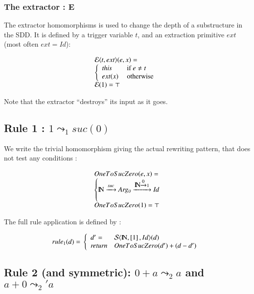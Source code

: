 \subsubsection{The extractor : {\cal E}}

The extractor homomorphisms is used to change the depth of a substructure in the SDD. It is defined by a trigger variable $t$, and an extraction primitive $ext$  (most often $ext = \mathit{Id}$):

$$
\begin{array}{lcl}
{\cal E}\langle {t,ext} \rangle (e,x)= \\
\left\{\begin{array}{ll}
\mathit{this} & \mbox{ if } e \neq t \\
ext (x) & \mbox{ otherwise } \\
\end{array}
\right. \\
 {\cal E}(1) = \top 
\end{array}
$$

Note that the extractor ``destroys'' its input as it goes.


\subsection{Rule 1 : $1 \leadsto_1 suc(0)$}

We write the trivial homomorphism giving the actual rewriting pattern, that does not test any conditions :

$$
\begin{array}{lcl}
{OneToSucZero} (e,x)= \\
\left\{
 \mbox{${\rm I\!N}$} \xrightarrow{\scriptstyle {suc}} \mathit{Arg_0} \xrightarrow{\scriptstyle { \mbox{${\rm I\!N}$}\ensuremath{\xrightarrow{\scriptstyle {0}}} 1 }}  \mathit{Id}
\right. \\
 {OneToSucZero}(1) = \top 
\end{array}
$$

The full rule application is defined by :

$$
rule_1 (d) =  \\
\left\{\begin{array}{ll}
d' = &  {\cal S}\langle {\mbox{${\rm I\!N}$},\left[1\right],Id} \rangle (d) \\
\mathit{return} &  OneToSucZero (d') + (d-d')
 \end{array}
\right. \\
$$


\subsection{Rule 2 (and symmetric): $0 + a \leadsto_2 a$  and $a + 0 \leadsto_2' a$}

